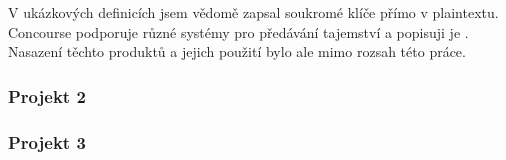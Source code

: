             V ukázkových definicích jsem vědomě zapsal soukromé klíče přímo v plaintextu. Concourse podporuje různé systémy pro předávání tajemství a popisuji je . Nasazení těchto produktů a jejich použití bylo ale mimo rozsah této práce.

        \subsubsection{Projekt 2}
            \blind[2]

        \subsubsection{Projekt 3}
            \blind[2]
